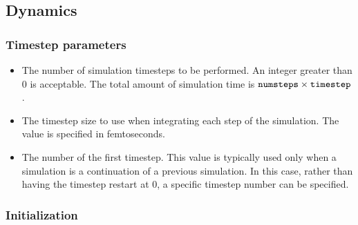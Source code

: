 \subsection{Dynamics}
\label{section:config_basic}

\subsubsection{Timestep parameters}

\begin{itemize}
\item
{}
{\label{param:numsteps}
The number of simulation timesteps to be performed.  
An integer greater than 0 is acceptable.  
The total amount of simulation 
time is $\mbox{{\tt numsteps}} \times \mbox{{\tt timestep}}$.}

\item
{}
{The timestep size to use when integrating each step of the simulation.  
The value is specified in femtoseconds.}

\item
{}
{The number of the first timestep.  This value is typically used only 
when a simulation is a continuation of a previous simulation.  In this 
case, rather than having the timestep restart at 0, a specific timestep 
number can be specified.}

\end{itemize}


\subsubsection{Initialization}

